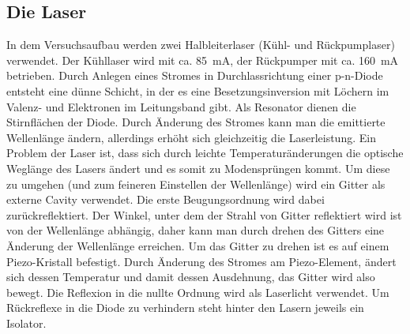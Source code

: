 \documentclass[12pt, a4paper]{article}
\begin{document}
  \subsection{Die Laser}
    In dem Versuchsaufbau werden zwei Halbleiterlaser (Kühl- und Rückpumplaser)
    verwendet. Der Kühllaser wird mit ca. \SI{85}{\mA}, der Rückpumper mit ca.
    \SI{160}{\mA} betrieben. Durch Anlegen eines Stromes in Durchlassrichtung
    einer p-n-Diode entsteht eine dünne Schicht, in der es eine Besetzungsinversion
    mit Löchern im Valenz- und Elektronen im Leitungsband gibt. Als Resonator
    dienen die Stirnflächen der Diode. Durch Änderung des Stromes kann man die
    emittierte Wellenlänge ändern, allerdings erhöht sich gleichzeitig die
    Laserleistung. Ein Problem der Laser ist, dass sich durch leichte
    Temperaturänderungen die optische Weglänge des Lasers ändert und es somit zu
    Modensprüngen kommt. Um diese zu umgehen (und zum feineren Einstellen der
    Wellenlänge) wird ein Gitter als externe Cavity verwendet. Die erste
    Beugungsordnung wird dabei zurückreflektiert. Der Winkel, unter dem der Strahl
    von Gitter reflektiert wird ist von der Wellenlänge abhängig, daher kann man
    durch drehen des Gitters eine Änderung der Wellenlänge erreichen. Um das Gitter
    zu drehen ist es auf einem Piezo-Kristall befestigt. Durch Änderung des Stromes
    am Piezo-Element, ändert sich dessen Temperatur und damit dessen Ausdehnung, das
    Gitter wird also bewegt. Die Reflexion in die nullte Ordnung wird als Laserlicht
    verwendet. Um Rückreflexe in die Diode zu verhindern steht hinter den Lasern
    jeweils ein Isolator.
\end{document}
